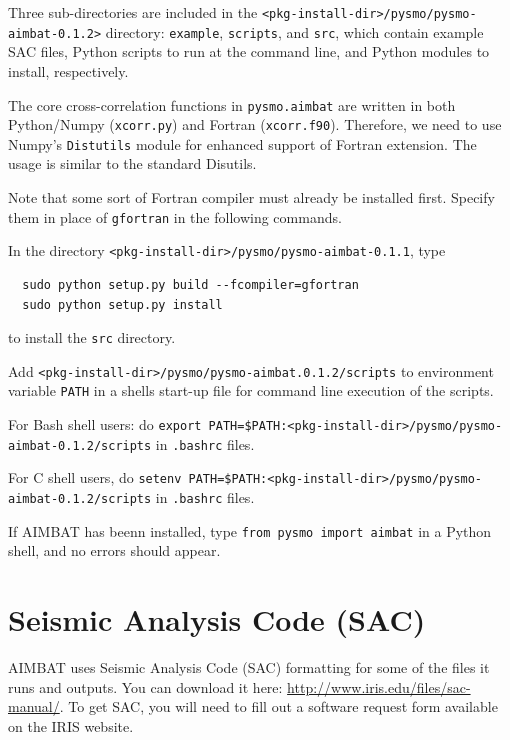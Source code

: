 \documentclass[letterpaper,10pt]{article}
\begin{document}
Three sub-directories are included in the \verb"<pkg-install-dir>/pysmo/pysmo-aimbat-0.1.2>" directory: \verb"example", \verb"scripts", and \verb"src", which contain example SAC files, Python scripts to run at the command line, and Python modules to install, respectively.

The core cross-correlation functions in \verb"pysmo.aimbat" are written in both Python/Numpy (\verb"xcorr.py") and Fortran (\verb"xcorr.f90"). Therefore, we need to use Numpy's \verb"Distutils" module for enhanced support of Fortran extension. The usage is similar to the standard Disutils. 

Note that some sort of Fortran compiler must already be installed first. Specify them in place of \verb"gfortran" in the following commands.

In the directory \verb"<pkg-install-dir>/pysmo/pysmo-aimbat-0.1.1", type

\begin{verbatim}
  sudo python setup.py build --fcompiler=gfortran
  sudo python setup.py install 
\end{verbatim}

to install the \verb"src" directory. 

Add \verb"<pkg-install-dir>/pysmo/pysmo-aimbat.0.1.2/scripts" to environment variable \verb"PATH" in a shells start-up file for command line execution of the scripts.

For Bash shell users: do \verb"export PATH=$PATH:<pkg-install-dir>/pysmo/pysmo-aimbat-0.1.2/scripts" in \verb".bashrc" files.

For C shell users, do \verb"setenv PATH=$PATH:<pkg-install-dir>/pysmo/pysmo-aimbat-0.1.2/scripts" in \verb".bashrc" files.

If AIMBAT has beenn installed, type \verb"from pysmo import aimbat" in a Python shell, and no errors should appear. 


\section{Seismic Analysis Code (SAC)}

AIMBAT uses Seismic Analysis Code (SAC) formatting for some of the files it runs and outputs. You can download it here: \url{http://www.iris.edu/files/sac-manual/}. To get SAC, you will need to fill out a software request form available on the IRIS website.
\end{document}
